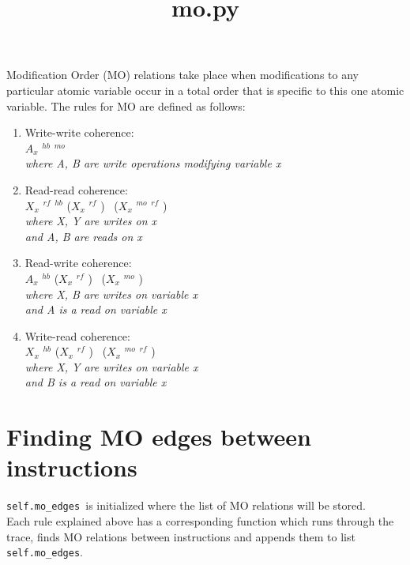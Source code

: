 \documentclass{article}
\date{}
\newcommand{\var}[1]{\color{OliveGreen} \texttt{#1}\color{black}}
\newcommand{\rf}[2]{{#1} {\color{Blue}\rightarrow$^{rf}$} \color{black}{#2}}
\newcommand{\hb}[2]{{#1} {\color{Blue}\rightarrow$^{hb}$} \color{black}{#2}}
\newcommand{\mo}[2]{{#1} {\color{OliveGreen}\rightarrow$^{mo}$} \color{black}{#2}}
\begin{document}
\title{mo.py}
\maketitle

Modification Order (MO) relations take place when modifications to any particular atomic variable occur in a total order that is specific to this one atomic variable. The rules for MO are defined as follows:
\begin{enumerate}
    \item Write-write coherence: \\
    \hb{$A_x$}{$B_x$} \implies \mo{$A_x$}{$B_x$}\\
    \textit{where A, B are write operations modifying variable x}
    
    \item Read-read coherence:\\
    \hb{\rf{$X_x$}{$A_x$}}{$B_x$} \implies (\rf{$X_x$}{$B_x$}) \lor\ (\rf{\mo{$X_x$}{$Y_x$}}{$B_x$})\\
    \textit{where X, Y are writes on x\\ and A, B are reads on x}
    
    \item Read-write coherence:\\
    \hb{$A_x$}{$B_x$} \implies (\rf{$X_x$}{$A_x$}) \land\ (\mo{$X_x$}{$B_x$})\\
    \textit{where X, B are writes on variable x\\and A is a read on variable x}
    
    \item Write-read coherence:\\
    \hb{$X_x$}{$B_x$} \implies (\rf{$X_x$}{$B_x$}) \lor\ (\rf{\mo{$X_x$}{$Y_x$}}{$B_x$})\\
    \textit{where X, Y are writes on variable x\\and B is a read on variable x}
\end{enumerate}

\section{Finding MO edges between instructions}
\var{self.mo\_edges }is initialized where the list of MO relations will be stored.\\

Each rule explained above has a corresponding function which runs through the trace, finds MO relations between instructions and appends them to list \var{self.mo\_edges}.
\end{document}
